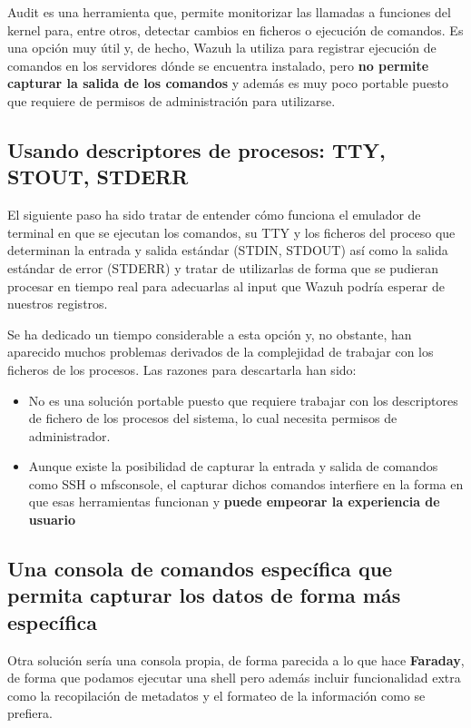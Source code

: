 Audit es una herramienta que, permite monitorizar las llamadas a funciones del kernel para, entre otros, detectar cambios en ficheros o ejecución de comandos. Es una opción muy útil y, de hecho, Wazuh la utiliza para registrar ejecución de comandos en los servidores dónde se encuentra instalado, pero \textbf{no permite capturar la salida de los comandos} y además es muy poco portable puesto que requiere de permisos de administración para utilizarse.

\subsection{Usando descriptores de procesos: TTY, STOUT, STDERR}

El siguiente paso ha sido tratar de entender cómo funciona el emulador de terminal en que se ejecutan los comandos, su TTY y los ficheros del proceso que determinan la entrada y salida estándar (STDIN, STDOUT) así como la salida estándar de error (STDERR) y tratar de utilizarlas de forma que se pudieran procesar en tiempo real para adecuarlas al input que Wazuh podría esperar de nuestros registros.

Se ha dedicado un tiempo considerable a esta opción y, no obstante, han aparecido muchos problemas derivados de la complejidad de trabajar con los ficheros de los procesos. Las razones para descartarla han sido:

\begin{itemize}
    \item No es una solución portable puesto que requiere trabajar con los descriptores de fichero de los procesos del sistema, lo cual necesita permisos de administrador.
    \item Aunque existe la posibilidad de capturar la entrada y salida de comandos como SSH o mfsconsole, el capturar dichos comandos interfiere en la forma en que esas herramientas funcionan y \textbf{puede empeorar la experiencia de usuario}
\end{itemize}

\subsection{Una consola de comandos específica que permita capturar los datos de forma más específica}

Otra solución sería una consola propia, de forma parecida a lo que hace \textbf{Faraday}, de forma que podamos ejecutar una shell pero además incluir funcionalidad extra como la recopilación de metadatos y el formateo de la información como se prefiera.

